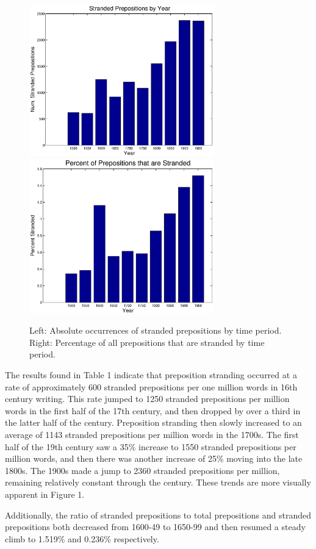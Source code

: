 \documentclass[DIV=calc, paper=letter, fontsize=12pt]{scrartcl}	 %
\begin{document}
\begin{multicols}{2}
\begin{figure}
	\includegraphics[width=80mm]{preposition1.eps} \includegraphics[width=80mm]{preposition2.eps}
	\caption{Left: Absolute occurrences of stranded prepositions by time period. \\Right: Percentage of all prepositions that are stranded by time period.}
\end{figure}

The results found in Table 1 indicate that preposition stranding occurred at a rate of approximately 600 stranded prepositions per one million words in 16th century writing. This rate jumped to 1250 stranded prepositions per million words in the first half of the 17th century, and then dropped by over a third in the latter half of the century. Preposition stranding then slowly increased to an average of 1143 stranded prepositions per million words in the 1700s. The first half of the 19th century saw a 35\% increase to 1550 stranded prepositions per million words, and then there was another increase of 25\% moving into the late 1800s. The 1900s made a jump to 2360 stranded prepositions per million, remaining relatively constant through the century. These trends are more visually apparent in Figure 1.

Additionally, the ratio of stranded prepositions to total prepositions and stranded prepositions both decreased from 1600-49 to 1650-99 and then resumed a steady climb to 1.519\% and 0.236\% respectively.


\end{multicols}
\end{document}
